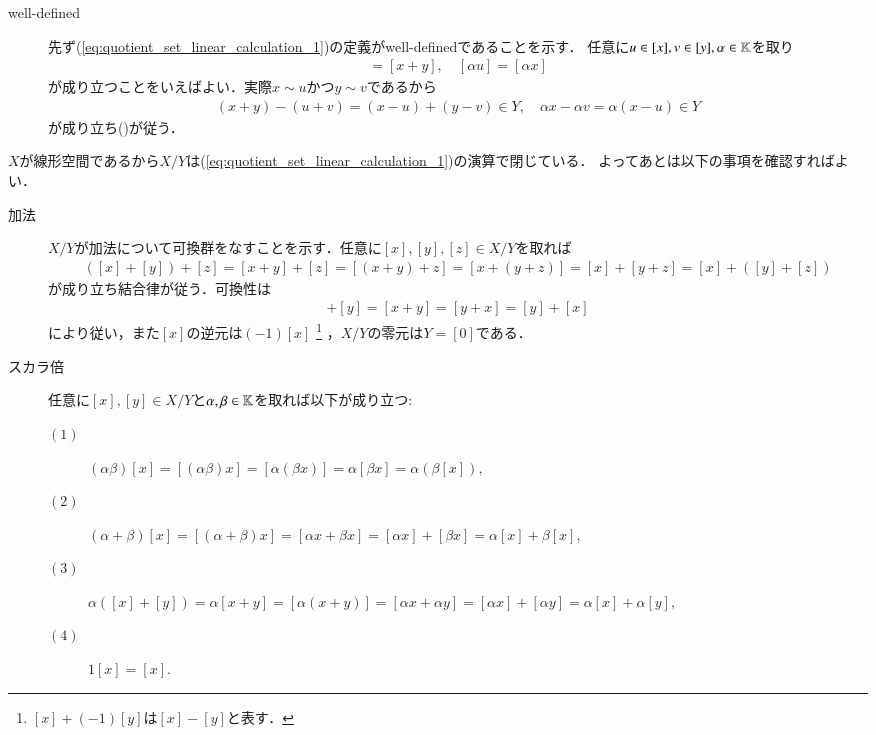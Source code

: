 	\begin{prf}\mbox{}
		\begin{description}
			\item[well-defined]
				先ず(\ref{eq:quotient_set_linear_calculation_1})の定義がwell-definedであることを示す．
				任意に$u \in [x],v \in [y],\alpha \in \mathbb{K}$を取り
				\begin{align}
					[u + v] = [x + y], \quad [\alpha u] = [\alpha x]
					\label{eq:quotient_set_linear_calculation_2}
				\end{align}
				が成り立つことをいえばよい．実際$x \sim u$かつ$y \sim v$であるから
				\begin{align}
					(x + y) - (u + v) = (x - u) + (y - v) \in Y,
					\quad \alpha x - \alpha v = \alpha(x - u) \in Y
					\end{align}
				が成り立ち()が従う．
		\end{description}
		$X$が線形空間であるから$X/Y$は(\ref{eq:quotient_set_linear_calculation_1})の演算で閉じている．
		よってあとは以下の事項を確認すればよい．
		\begin{description}
			\item[加法]
				$X/Y$が加法について可換群をなすことを示す．任意に$[x],[y],[z] \in X/Y$を取れば
				\begin{align}
					([x]+[y]) + [z] = [x+y] + [z] = [(x+y) + z] = [x + (y+z)] = [x] + [y+z] = [x] + ([y]+[z])
				\end{align}
				が成り立ち結合律が従う．可換性は
				\begin{align}
					[x] + [y] = [x + y] = [y + x] = [y] + [x]
				\end{align}
				により従い，また$[x]$の逆元は$(-1)[x]$
				\footnote{
					$[x] + (-1)[y]$は$[x] - [y]$と表す．
				}
				，$X/Y$の零元は$Y = [0]$である．
				
			\item[スカラ倍]
				任意に$[x],[y] \in X/Y$と$\alpha,\beta \in \mathbb{K}$を取れば以下が成り立つ:
				\begin{description}
					\item[$(1)$] $(\alpha\beta)[x] = [(\alpha\beta)x] = [\alpha(\beta x)] = \alpha[\beta x] = \alpha(\beta [x]),$
					\item[$(2)$] $(\alpha + \beta)[x] = [(\alpha + \beta)x] = [\alpha x + \beta x] = [\alpha x] + [\beta x] = \alpha [x] + \beta [x],$
					\item[$(3)$] $\alpha ([x] + [y]) = \alpha [x+y] = [\alpha(x+y)] = [\alpha x + \alpha y] = [\alpha x] + [\alpha y] = \alpha [x] + \alpha [y],$
					\item[$(4)$] $1 [x] = [x].$
				\end{description}
		\end{description}
		\QED
	\end{prf}
	

